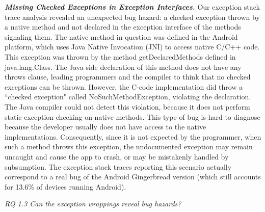 \emph{\textbf{Missing Checked Exceptions in Exception Interfaces.}} 
Our exception stack trace analysis revealed an unexpected bug hazard: a 
checked exception thrown by a native method and not declared in the exception 
interface of the methods signaling them. The native method in question was defined in
 the Android platform, which uses Java Native Invocation (JNI) to access 
native C/C++ code. This exception was thrown by the method getDeclaredMethods defined in java.lang.Class. 
The Java-side declaration of this method does not have any throws clause, 
leading programmers and the compiler to think that no checked exceptions can be thrown.
 However, the C-code implementation did throw a ``checked exception" called NoSuchMethodException, 
violating the declaration. The Java compiler could not detect this violation, because it does 
not perform static exception checking on native methods. This type of bug is hard to diagnose
because the developer usually does not have access to the native implementations. 
Consequently, since it is not expected by the programmer, when such a method throws 
this exception, the undocumented exception may remain
uncaught and cause the app to crash, or may be mistakenly handled by subsumption.
The exception stack traces reporting this scenario actually correspond
to a real bug of the Android 
Gingerbread version (which still accounts for 13.6\% of devices running Android).

\bigskip


\bigskip

\noindent\emph{RQ 1.3 Can the exception wrappings reveal bug hazards?}

\bigskip

